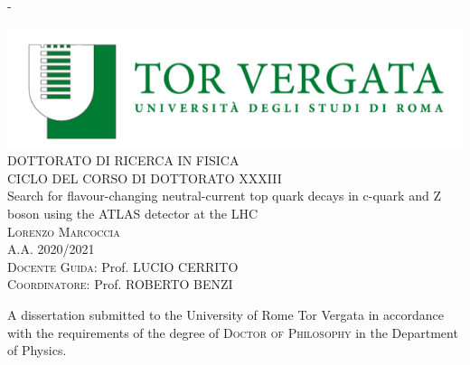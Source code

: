 
\begin{adjustwidth*}{\unitlength}{-\unitlength}
	\begin{center}
		\includegraphics[scale=1]{frontmatter/figures/uniroma2}\\
		\vspace{1cm}
		{\large\textsc{DOTTORATO DI RICERCA IN FISICA}}\\
		\vspace{0.8cm}
		{\large\textsc{CICLO DEL CORSO DI DOTTORATO XXXIII}}\\
		\vspace{1cm}
		{\LARGE{Search for flavour-changing neutral-current top quark decays in c-quark and Z boson using the ATLAS detector at the LHC}}\\
		\vspace{6.5mm}
		{\large\textsc{Lorenzo Marcoccia}}\\
		\vspace{1cm}
		{\large\textsc{A.A. 2020/2021}}\\
		\vspace{10mm}
		{\large{\textsc{Docente Guida:}  Prof. LUCIO CERRITO}}\\ 
		\vspace{5mm}
		{\large{\textsc{Coordinatore:   }  Prof. ROBERTO BENZI}}\\ 
		\vspace{3mm}
		\begin{minipage}{10cm}
			\vspace{1cm}
			A dissertation submitted to the University of Rome Tor Vergata  in accordance with the requirements of the degree of \textsc{Doctor of Philosophy} in the Department of Physics.
		\end{minipage}\\
		\vspace{9mm}
		{\large\textsc{}}
		\vspace{12mm}
	\end{center}
\end{adjustwidth*}
\newpage